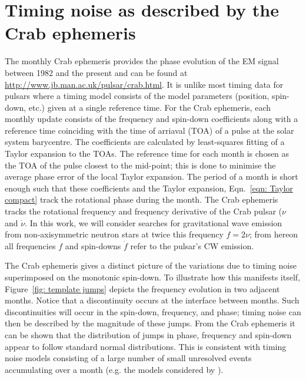 \documentclass[../full_thesis/full_thesis.tex]{subfiles}
\begin{document}
\section{Timing noise as described by the Crab ephemeris}
\label{sec: timing noise as described by the crab ephemeris}
The monthly Crab ephemeris \citep{Lyne1993} provides the phase evolution of the
EM signal between 1982 and the present and can be found at
\url{http://www.jb.man.ac.uk/pulsar/crab.html}. It is unlike most timing data
for pulsars where a timing model consists of the model parameters (position,
spin-down, etc.) given at a single reference time.  For the Crab ephemeris,
each monthly update consists of the frequency and spin-down coefficients along
with a reference time coinciding with the time of arriaval (TOA) of a pulse at
the solar system barycentre. The coefficients are calculated by  least-squares
fitting of a Taylor expansion to the TOAs. The reference time for each month is
chosen as the TOA of the pulse closest to the mid-point; this is done to
minimise the average phase error of the local Taylor expansion.  The period of
a month is short enough such that these coefficients and the Taylor
expansion, Eqn.~\eqref{eqn: Taylor compact} track the rotational phase during
the month. The Crab ephemeris tracks
the rotational frequency and frequency derivative of the Crab pulsar ($\nu$ and
$\dot{\nu}$. In this work, we will consider searches for gravitational
wave emission from
non-axisymmetric neutron stars at twice this frequency $f = 2\nu$; from hereon
all frequencies $f$ and spin-downs $\dot{f}$ refer to the pulsar's CW emission.

The Crab ephemeris gives a distinct picture of the variations due to timing
noise superimposed on the monotonic spin-down. To illustrate how this manifests
itself, Figure~\ref{fig: template jumps} depicts the frequency evolution in two
adjacent months. Notice that a discontinuity occurs at the interface between
months.  Such discontinuities will occur in the spin-down, frequency, and
phase; timing noise can then be described by the magnitude of these jumps.
From the Crab ephemeris it can be shown that the distribution of jumps in
phase, frequency and spin-down appear to follow standard normal distributions.
This is consistent with timing noise models consisting of a large number of
small unresolved events accumulating over a month (e.g. the models considered
by \citet{Cordes1981}). 
\end{document}
